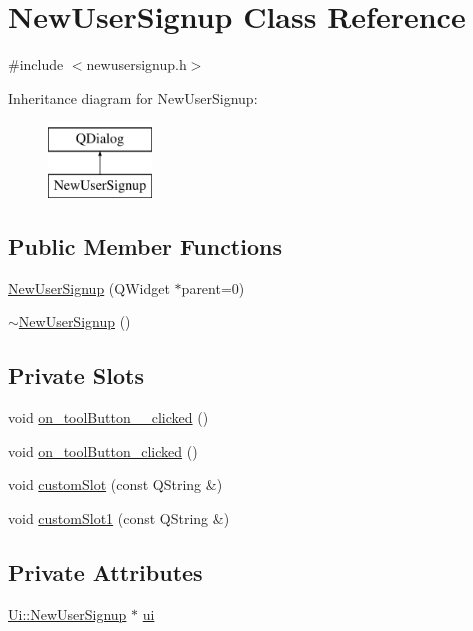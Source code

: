 \hypertarget{classNewUserSignup}{\section{New\-User\-Signup Class Reference}
\label{classNewUserSignup}
}


{\ttfamily \#include $<$newusersignup.\-h$>$}

Inheritance diagram for New\-User\-Signup\-:\begin{figure}[H]
\begin{center}
\leavevmode
\includegraphics[height=2.000000cm]{classNewUserSignup}
\end{center}
\end{figure}
\subsection*{Public Member Functions}
\begin{DoxyCompactItemize}
\item 
\hyperlink{classNewUserSignup_a8011b2f4118634e42f86318394d1051f}{New\-User\-Signup} (Q\-Widget $\ast$parent=0)
\item 
\hyperlink{classNewUserSignup_a7ea218eeca66081ff4922b0498974d51}{$\sim$\-New\-User\-Signup} ()
\end{DoxyCompactItemize}
\subsection*{Private Slots}
\begin{DoxyCompactItemize}
\item 
void \hyperlink{classNewUserSignup_a9065f1c1dc9f16426969a7ac46891574}{on\-\_\-tool\-Button\-\_\-\_\-clicked} ()
\item 
void \hyperlink{classNewUserSignup_a790a7c5281673b1a9cadcf820f4254bd}{on\-\_\-tool\-Button\-\_\-clicked} ()
\item 
void \hyperlink{classNewUserSignup_aa865ee3a3da5ec3dead8d0220f05d85d}{custom\-Slot} (const Q\-String \&)
\item 
void \hyperlink{classNewUserSignup_a7531394518b62abd460b011a0e6b7b69}{custom\-Slot1} (const Q\-String \&)
\end{DoxyCompactItemize}
\subsection*{Private Attributes}
\begin{DoxyCompactItemize}
\item 
\hyperlink{classUi_1_1NewUserSignup}{Ui\-::\-New\-User\-Signup} $\ast$ \hyperlink{classNewUserSignup_a249d6a4fe5f25a85c3fbcd0b201da545}{ui}
\end{DoxyCompactItemize}


